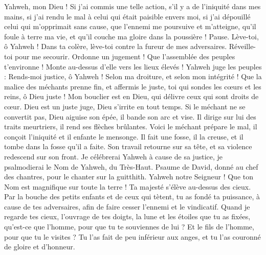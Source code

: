 \begin{multicols}{2}
Yahweh, mon Dieu ! Si j'ai commis une telle action, s'il y a de l'iniquité dans mes mains,
si j’ai rendu le mal à celui qui était paisible envers moi, si j’ai dépouillé celui qui m’opprimait sans cause,
que l'ennemi me poursuive et m'atteigne, qu'il foule à terre ma vie, et qu'il couche ma gloire dans la poussière ! Pause.
Lève-toi, ô Yahweh ! Dans ta colère, lève-toi contre la fureur de mes adversaires. Réveille-toi pour me secourir. Ordonne un jugement !
Que l'assemblée des peuples t'environne ! Monte au-dessus d’elle vers les lieux élevés !
Yahweh juge les peuples : Rends-moi justice, ô Yahweh ! Selon ma droiture, et selon mon intégrité !
Que la malice des méchants prenne fin, et affermis le juste, toi qui sondes les cœurs et les reins, ô Dieu juste !
Mon bouclier est en Dieu, qui délivre ceux qui sont droits de cœur.
Dieu est un juste juge, Dieu s'irrite en tout temps.
Si le méchant ne se convertit pas, Dieu aiguise son épée, il bande son arc et vise.
Il dirige sur lui des traits meurtriers, il rend ses flèches brûlantes.
Voici le méchant prépare le mal, il conçoit l’iniquité et il enfante le mensonge.
Il fait une fosse, il la creuse, et il tombe dans la fosse qu'il a faite.
Son travail retourne sur sa tête, et sa violence redescend sur son front.
Je célébrerai Yahweh à cause de sa justice, je psalmodierai le Nom de Yahweh, du Très-Haut.
\VerseOne{}Psaume de David, donné au chef des chantres, pour le chanter sur la guitthith.
Yahweh notre Seigneur ! Que ton Nom est magnifique sur toute la terre ! Ta majesté s’élève au-dessus des cieux.
Par la bouche des petits enfants et de ceux qui tètent, tu as fondé ta puissance, à cause de tes adversaires, afin de faire cesser l'ennemi et le vindicatif.
Quand je regarde tes cieux, l'ouvrage de tes doigts, la lune et les étoiles que tu as fixées,
qu'est-ce que l'homme, pour que tu te souviennes de lui ? Et le fils de l'homme, pour que tu le visites ?
Tu l'as fait de peu inférieur aux anges, et tu l'as couronné de gloire et d'honneur.

\end{multicols}

